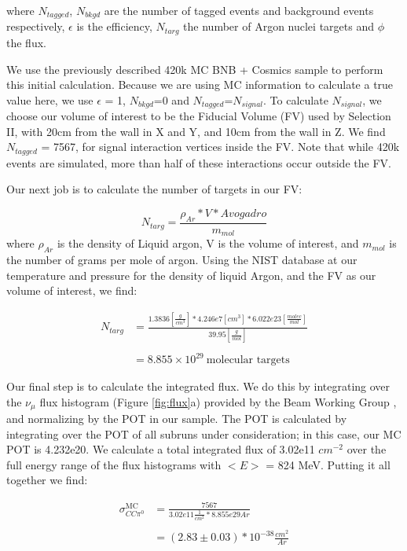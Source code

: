\noindent where $N_{tagged}$, $N_{bkgd}$ are the number of tagged events and background events respectively, $\epsilon$ is the efficiency, $N_{targ}$ the number of Argon nuclei targets and $\phi$ the flux. 
\par We use the previously described 420k MC BNB + Cosmics sample to perform this initial calculation.  Because we are using MC information to calculate a true value here, we use $\epsilon$ = 1, $N_{bkgd}$=0 and $N_{tagged}$=$N_{signal}$.  To calculate $N_{signal}$, we choose our volume of interest to be the Fiducial Volume (FV) used by Selection II, with 20cm from the wall in X and Y, and 10cm from the wall in Z. We find $N_{tagged}$ = 7567, for signal interaction vertices inside the FV. Note that while 420k events are simulated, more than half of these interactions occur outside the FV. 
\par Our next job is to calculate the number of targets in our FV:

\begin{equation} \label{eq:1}
  N_{targ} = \frac{\rho_{Ar} * V * Avogadro}{m_{mol}} 
\end{equation}
\noindent where $\rho_{Ar}$ is the density of Liquid argon, V is the volume of interest, and $m_{mol}$ is the number of grams per mole of argon.  Using the NIST database at our temperature and pressure for the density of liquid Argon, and the FV as our volume of interest, we find: 

\begin{align}
N_{targ} &= \frac{1.3836 [\frac{g}{cm^3}] * 4.246e7 [cm^3] * 6.022e23 [\frac{molec}{mol}]}{39.95 [\frac{g}{mol}]} \\\\
&= 8.855\times10^{29}~\text{molecular targets}
\end{align}

\par Our final step is to calculate the integrated flux.  We do this by integrating over the $\nu_\mu$ flux histogram (Figure \ref{fig:flux}a) provided by the Beam Working Group \cite{bib:flux}, and normalizing by the POT in our sample. The POT is calculated by integrating over the POT of all subruns under consideration; in this case, our MC POT is 4.232e20.  We calculate a total integrated flux of 3.02e11 $cm^{-2}$ over the full energy range of the flux histograms with $<E>$ = 824 MeV. 
\noindent Putting it all together we find:


\begin{align}
\sigma^{\text{MC}}_{CC\pi^0} &= \frac{7567}{3.02e11 \frac{1}{cm^2} * 8.855e29 Ar } \\\\
&= (2.83 \pm 0.03) *10^{-38} \frac{cm^2}{Ar}
\end{align}

